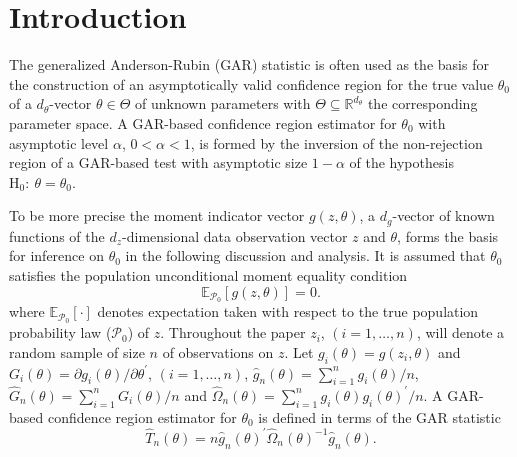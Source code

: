 \documentclass[hidelinks, 11 pt, a4paper, pdflatex]{article}
\renewcommand{\thepage}{}
\begin{document}
{%

\newpage


 \section{Introduction}

  \setcounter{page}{1}
  \renewcommand{\thepage}{[\arabic{page}]}
  \setcounter{equation}{0}

  \indent The generalized Anderson-Rubin (GAR) statistic is often used as the basis for the construction of an asymptotically valid confidence region for the true value $\theta_{0}$ of a $d_{\theta}$-vector $\theta \in \Theta$ of unknown parameters with $\Theta \subseteq \mathbb{R}^{d_{\theta}}$ the corresponding parameter space. A GAR-based confidence region estimator for $\theta_{0}$ with asymptotic level $\alpha$, $0 < \alpha < 1$, is formed by the inversion of the non-rejection region of a GAR-based test with asymptotic size $1 - \alpha$ of the hypothesis $\mathrm{H}_{0}:~\theta = \theta_{0}$.

  To be more precise the moment indicator vector $g(z,\theta)$, a $d_{g}$-vector of known functions of the $d_{z}$-dimensional data observation vector $z$ and $\theta$, forms the basis for inference on $\theta_{0}$ in the following discussion and analysis. It is assumed that $\theta_0$ satisfies the population unconditional moment equality condition
   \begin{equation} \label{mom.condn}
    \mathbb{E}_{\mathcal{P}_0}[g(z,\theta)] = 0.
   \end{equation}
  where $\mathbb{E}_{\mathcal{P}_0}[\cdot]$ denotes expectation taken with respect to the true population probability law ($\mathcal{P}_0$) of $z$. Throughout the paper $z_{i}$, $(i=1,\ldots,n)$, will denote a random sample of size $n$ of observations on $z$. Let $g_{i}(\theta) = g(z_{i},\theta)$ and $G_{i}(\theta) = \partial g_{i}(\theta)/\partial \theta^{\prime}$, $(i=1,\ldots,n)$, $\hat{g}_{n}(\theta) = \sum_{i=1}^{n} g_{i}(\theta)/n$, $\hat{G}_n(\theta) = \sum_{i=1}^{n} G_{i}(\theta)/n$ and $\hat{\Omega}_{n}(\theta) = \sum_{i=1}^{n} g_{i}(\theta)g_{i}(\theta)^{\prime}/n$. A GAR-based confidence region estimator for $\theta_0$ is defined in terms of the GAR statistic
   \begin{equation} \label{GAR.statistic}
    \hat{T}_n(\theta) = n \hat{g}_n(\theta)^{\prime} \hat{\Omega}_{n}(\theta)^{-1} \hat{g}_n(\theta).
   \end{equation}

}
\end{document}
